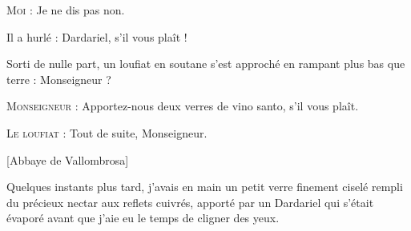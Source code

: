 \begin{dialogue}
\textsc{Moi} : Je ne dis pas non.

Il a hurlé : Dardariel, s’il vous plaît !

Sorti de nulle part, un loufiat en soutane s’est approché en rampant plus bas que terre : Monseigneur ?

\textsc{Monseigneur} : Apportez-nous deux verres de vino santo, s’il vous plaît.

\textsc{Le loufiat} : Tout de suite, Monseigneur.

\end{dialogue}

%
%
[Abbaye de Vallombrosa]%

Quelques instants plus tard, j’avais en main un petit verre finement ciselé rempli du précieux nectar aux reflets cuivrés, apporté par un Dardariel qui s’était évaporé avant que j’aie eu le temps de cligner des yeux.


